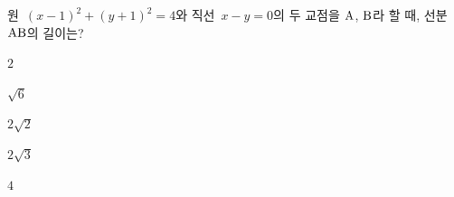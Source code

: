 원~$(x-1)^2+(y+1)^2=4$와 직선~$x-y=0$의 두 교점을 $\mathrm{A}$, $\mathrm{B}$라 할 때, 선분~$\mathrm{AB}$의 길이는?
\begin{choices32}{\rule[-3ex]{0pt}{8ex}$2$}{\rule[-3ex]{0pt}{8ex}$\sqrt{6}$}{\rule[-3ex]{0pt}{8ex}$2\sqrt{2}$}{\rule[-3ex]{0pt}{8ex}$2\sqrt{3}$}{\rule[-3ex]{0pt}{8ex}$4$}\end{choices32}
